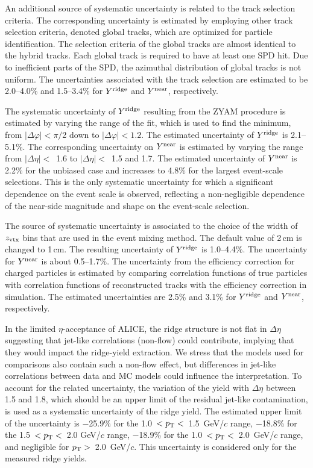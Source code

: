 An additional source of systematic uncertainty is related to the track selection criteria. The corresponding uncertainty is estimated by employing other track selection criteria, denoted global tracks, which are optimized for particle identification. The selection criteria of the global tracks are almost identical to the hybrid tracks. Each global track is required to have at least one SPD hit. Due to inefficient parts of the SPD, the azimuthal distribution of global tracks is not uniform.
The uncertainties associated with the track selection are estimated to be 2.0--4.0\% and 1.5--3.4\% for $Y^{\rm{ridge}}$ and $Y^{\rm{near}}$, respectively.

The systematic uncertainty of $Y^{\rm{ridge}}$ resulting from the ZYAM procedure is estimated by varying the range of the fit, which is used to find the minimum, from $|\Delta\varphi|<\pi/$2 down to $|\Delta\varphi|<1.2$. The estimated uncertainty of $Y^{\rm{ridge}}$ is 2.1--5.1\%. The corresponding uncertainty on $Y^{\rm{near}}$ is estimated by varying the range from $|\Delta\eta|<$~1.6 to $|\Delta\eta|<$~1.5 and 1.7. The estimated uncertainty of $Y^{\rm{near}}$ is 2.2\% for the unbiased case and increases to 4.8\% for the largest event-scale selections. This is the only systematic uncertainty for which a significant dependence on the event scale is observed, reflecting a non-negligible dependence of the near-side magnitude and shape on the event-scale selection.

The source of systematic uncertainty is associated to the choice of the width of $z_{\rm vtx}$ bins that are used in the event mixing method. The default value of 2\,cm is changed to 1\,cm. The resulting uncertainty of $Y^{\rm{ridge}}$ is 1.0--4.4\%.
The uncertainty for $Y^{\rm{near}}$ is about 0.5--1.7\%. The uncertainty from the efficiency correction for charged particles is estimated by comparing correlation functions of true particles with correlation functions of reconstructed tracks with the efficiency correction in simulation. The estimated uncertainties are 2.5\% and 3.1\% for $Y^{\rm{ridge}}$ and $Y^{\rm{near}}$, respectively. 

In the limited $\eta$-acceptance of ALICE, the ridge structure is not flat in $\Delta\eta$ suggesting that jet-like correlations (non-flow) could contribute, implying that they would impact the ridge-yield extraction. We stress that the models used for comparisons also contain such a non-flow effect, but differences in jet-like correlations between data and MC models could influence the interpretation. To account for the related uncertainty, the variation of the yield with $\Delta\eta$ between 1.5 and 1.8, which should be an upper limit of the residual jet-like contamination, is used as a systematic uncertainty of the ridge yield. The estimated upper limit of the uncertainty is $-$25.9\% for the 1.0~$<p_\mathrm{T}<$~1.5~GeV/$c$ range,  $-$18.8\% for the 1.5~$<p_\mathrm{T}<$~2.0 GeV/$c$ range,  $-$18.9\% for the 1.0~$<p_\mathrm{T}<$~2.0~GeV/$c$ range, and negligible for $p_\mathrm{T}>$~2.0~GeV/$c$. This uncertainty is considered only for the measured ridge yields.




